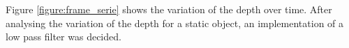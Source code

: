 Figure \ref{figure:frame_serie} shows the variation of the depth over time. After analysing the variation of the depth for a static object, an implementation of a low pass filter was decided.




